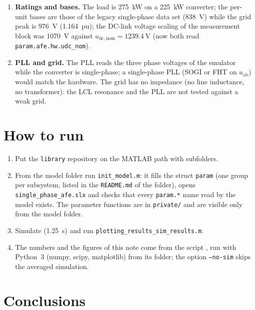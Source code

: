 \documentclass[11pt,a4paper]{scrartcl}
\newcommand{\ped}[1]{_{\mathrm{#1}}}
\newcommand{\code}[1]{\texttt{#1}}
\begin{document}
\begin{onehalfspace}
\begin{enumerate}[nosep]
	\item \textbf{Ratings and bases.} The load is \SI{275}{\kilo\watt} on a \SI{225}{\kilo\watt} converter; the per-unit bases are those of the legacy single-phase data set (\SI{838}{\volt}) while the grid peak is \SI{976}{\volt} (\SI{1.164}{pu}); the DC-link voltage scaling of the measurement block was \SI{1070}{\volt} against $u\ped{dc,nom} = \SI{1239.4}{\volt}$ (now both read \code{param.afe.hw.udc\_nom}).
	\item \textbf{PLL and grid.} The PLL reads the three phase voltages of the emulator while the converter is single-phase; a single-phase PLL (SOGI or FHT on $u\ped{ab}$) would match the hardware. The grid has no impedance (no line inductance, no transformer): the LCL resonance and the PLL are not tested against a weak grid.
\end{enumerate}

\section{How to run}
\label{sec:run}

\begin{enumerate}[nosep]
	\item Put the \code{library} repository on the MATLAB path with subfolders.
	\item From the model folder run \code{init\_model.m}: it fills the struct \code{param} (one group per subsystem, listed in the \code{README.md} of the folder), opens \code{single\_phase\_afe.slx} and checks that every \code{param.*} name read by the model exists. The parameter functions are in \code{private/} and are visible only from the model folder.
	\item Simulate (\SI{1.25}{\second}) and run \code{plotting\_results\_sim\_results.m}.
	\item The numbers and the figures of this note come from the script , run with Python~3 (numpy, scipy, matplotlib) from its folder; the option \code{--no-sim} skips the averaged simulation.
\end{enumerate}

\section{Conclusions}
\label{sec:conclusions}


\end{onehalfspace}
\end{document}
